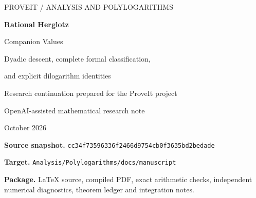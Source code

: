 \documentclass[11pt]{article}
\numberwithin{equation}{section}
\theoremstyle{definition}
\theoremstyle{remark}
\newcommand{\dd}{\,\mathrm d}
\newcommand{\snapshot}{\texttt{cc34f73596336f2466d9754cb0f3635bd2bedade}}
\begin{document}
\begin{titlepage}
\thispagestyle{empty}
\vspace*{0.45in}
{\sffamily\small PROVEIT \quad / \quad ANALYSIS AND POLYLOGARITHMS\par}
\vspace{0.55in}
{\LARGE\bfseries Rational Herglotz\par Companion Values\par}
\vspace{0.23in}
{\Large Dyadic descent, complete formal classification,\par and explicit dilogarithm identities\par}
\vspace{0.45in}
{\large Research continuation prepared for the ProveIt project\par}
\vspace{0.10in}
{\normalsize OpenAI-assisted mathematical research note\par October 2026\par}
\vspace{0.5in}
\begin{abstract}
\noindent
For the Herglotz companion
$J(x)=\int_0^1\log(1+t^x)/(1+t)\dd t$, we resolve the manuscript's
all-rational \emph{formal} reduction problem. At a reduced mixed-parity
ratio, with even entry $e$ and odd entry $o$, reduction to logarithms is
equivalent to $e^2\equiv\pm1\pmod o$ and $o^2\equiv1\pmod{2e}$.
Allowing rational dilogarithms adds precisely six rational arguments:
$1/3,3,1/5,5,3/5,5/3$. The proof combines a conductor-doubling identity
with rigidity of the new dyadic character layer. It uses the existing
all-conductor symbol theorem, whose proof is recalled.

We give a complete even-coefficient quadratic-recurrence parametrization
of the logarithmic cases and an all-finite-order height-counting expansion.
Analytically, a Hecke relation and the Rogers five-term identity yield an
explicit log-sine formula for every $J(n/(n+1))$, and a compact evaluation
of $J(3/5)$. A prime-seven exterior-logarithm witness disproves a
finite-field three-term assertion in the reviewed Radchenko--Zagier
preprint, without affecting the direct boundary formula used here.
Exact finite tests and independent high-precision integral comparisons
accompany the proofs. Formal non-reducibility is not numerical
transcendence; no period-injectivity or proof-assistant claim is made.
\end{abstract}
\vfill
\noindent\small
\textbf{Source snapshot.} \snapshot\par
\noindent\small
\textbf{Target.} \nolinkurl{Analysis/Polylogarithms/docs/manuscript}\par
\noindent\small
\textbf{Package.} LaTeX source, compiled PDF, exact arithmetic checks,
independent numerical diagnostics, theorem ledger and integration notes.
\end{titlepage}
\tableofcontents
\clearpage









\clearpage
{}
{}

\end{document}

